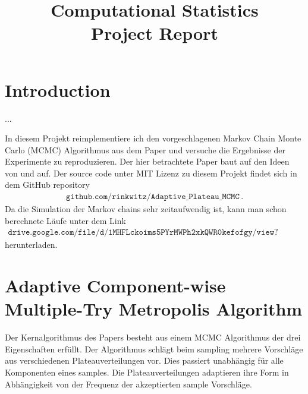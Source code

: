 \documentclass{scrartcl}
\title{Computational Statistics\\Project Report}
\begin{document}
    \maketitle


    \section{Introduction}
    ...

    In diesem Projekt reimplementiere ich den vorgeschlagenen Markov Chain Monte Carlo (MCMC) Algorithmus aus dem Paper
    \cite{lau2019} und versuche die Ergebnisse der Experimente zu reproduzieren. Der hier betrachtete Paper baut auf den Ideen von
    \cite{metropolis1953,geyer1992,liu2000} und \cite{yang2019} auf.
    Der source code unter MIT Lizenz zu diesem Projekt findet sich in dem GitHub repository
    \begin{align*}
        \texttt{github.com/rinkwitz/Adaptive\_Plateau\_MCMC}\,.
    \end{align*}
    Da die Simulation der Markov chains sehr zeitaufwendig ist, kann man schon berechnete Läufe unter dem Link
    \begin{align*}
        \texttt{drive.google.com/file/d/1MHFLckoims5PYrMWPh2xkQWR0kefofgy/view?usp=sharing}
    \end{align*}
    herunterladen.

    \section{Adaptive Component-wise Multiple-Try Metropolis Algorithm} Der Kernalgorithmus
    des Papers \cite{lau2019} besteht aus einem MCMC Algorithmus der drei Eigenschaften erfüllt. Der Algorithmus schlägt
    beim sampling mehrere Vorschläge aus verschiedenen Plateauverteilungen vor. Dies passiert unabhängig für alle
    Komponenten eines samples. Die Plateauverteilungen adaptieren ihre Form in Abhängigkeit von der Frequenz der akzeptierten sample Vorschläge.
\end{document}
